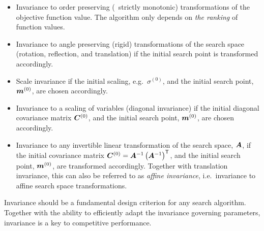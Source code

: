 \documentclass{article} %
\newcommand{\tutorial}[1]{{#1}}
\newcommand{\ve}[1]{\mathchoice{\mbox{\boldmath$\displaystyle#1$}}
  {\mbox{\boldmath$\textstyle#1$}} {\mbox{\boldmath$\scriptstyle#1$}}
  {\mbox{\boldmath$\scriptscriptstyle#1$}}}
\newcommand{\ma}[1]{\mathchoice{\mbox{\boldmath$\displaystyle#1$}}
  {\mbox{\boldmath$\textstyle#1$}} {\mbox{\boldmath$\scriptstyle#1$}}
  {\mbox{\boldmath$\scriptscriptstyle#1$}}}
\newcommand{\T}{\ensuremath{\mathsf{T}}}
\newcommand{\emphindex}[1]{\emph{#1}\index{#1}}
\newcommand{\rklam}[1]{\left({#1}\right)}
\newcommand{\sig}{\ensuremath{\sigma}}
\newcommand{\xmean}{\ensuremath{\ve{m}}}
\begin{document}
\begin{itemize}
\item Invariance to order preserving (\ie\ strictly monotonic)
  transformations of the
  objective function value. The \tutorial{algorithm only depends} on \emph{the ranking} of
  function values.
\item Invariance to angle preserving (rigid) transformations of the search space (rotation,
  reflection, and translation) if the initial search
  point\tutorial{ is} transformed accordingly.
\item Scale invariance if the initial scaling,
  e.g.\ $\sig^{(0)}$, and the initial search
  point\tutorial{, $\xmean^{(0)}$,} are chosen
  accordingly.
\item Invariance to a scaling of variables (diagonal invariance)
  if the initial diagonal covariance matrix $\ma{C}^{(0)}$, and the initial
  search point, $\xmean^{(0)}$, are chosen accordingly.

\item Invariance to any invertible linear transformation of the
  search space, $\mA$, if the initial covariance matrix
  $\ma{C}^{(0)}=\mA^{-1}\rklam{\mA^{-1}}^\T$, and the initial
  search point\tutorial{, $\xmean^{(0)}$, are}
  transformed accordingly. Together with translation invariance, this can 
  also be referred to as \emphindex{affine invariance}, i.e.\ invariance to 
  affine search space transformations. 
\end{itemize}
%
Invariance should be a fundamental design criterion for any search
algorithm. Together with the ability to efficiently adapt the
invariance governing parameters, invariance is a key to
competitive performance.
\end{document}
